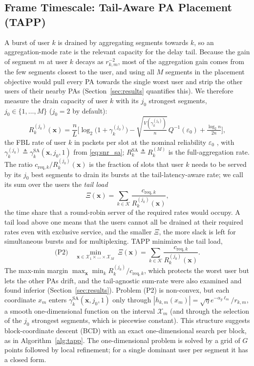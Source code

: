 \documentclass[journal]{IEEEtran}
\newcommand{\creqk}[1]{c_{\mathrm{req},#1}}
\newcommand{\vect}[1]{\bm{#1}}
\newcommand{\Kset}{\mathcal{K}}
\begin{document}
\subsection{Frame Timescale: Tail-Aware PA Placement (TAPP)}\label{sec:tapp}
A burst of user $k$ is drained by aggregating segments towards $k$, so an aggregation-mode rate is the relevant capacity for the delay tail. Because the gain of segment $m$ at user $k$ decays as $r_{k,m}^{-2}$, most of the aggregation gain comes from the few segments closest to the user, and using all $M$ segments in the placement objective would pull every PA towards the single worst user and strip the other users of their nearby PAs (Section~\ref{sec:results} quantifies this). We therefore measure the drain capacity of user $k$ with its $j_0$ strongest segments, $j_0\in\{1,\dots,M\}$ ($j_0=2$ by default):
\begin{equation}\label{eq:Rsa}
R_k^{(j_0)}(\vect x)=\frac{n}{L}\Big[\log_2\!\big(1+\gamma_k^{(j_0)}\big)-\sqrt{\tfrac{V(\gamma_k^{(j_0)})}{n}}\,Q^{-1}(\varepsilon_0)+\tfrac{\log_2 n}{2n}\Big],
\end{equation}
the FBL rate of user $k$ in packets per slot at the nominal reliability $\varepsilon_0$ \cite{Polyanskiy2010}, with $\gamma_k^{(j_0)}\triangleq\gamma_k^{\mathrm{SA}}(\vect x,j_0,1)$ from \eqref{eq:snr_sa}; $R_k^{\mathrm{SA}}\triangleq R_k^{(M)}$ is the full-aggregation rate. The ratio $\creqk{k}/R_k^{(j_0)}(\vect x)$ is the fraction of slots that user $k$ needs to be served by its $j_0$ best segments to drain its bursts at the tail-latency-aware rate; we call its sum over the users the \emph{tail load}
\begin{equation}\label{eq:load}
\Xi(\vect x)=\sum_{k\in\Kset}\frac{\creqk{k}}{R_k^{(j_0)}(\vect x)},
\end{equation}
the time share that a round-robin server of the required rates would occupy. A tail load above one means that the users cannot all be drained at their required rates even with exclusive service, and the smaller $\Xi$, the more slack is left for simultaneous bursts and for multiplexing. TAPP minimizes the tail load,
\begin{equation}\label{eq:P2}
\text{(P2)}\quad\min_{\vect x\in\mathcal X_1\times\dots\times\mathcal X_M}\ \Xi(\vect x)=\sum_{k\in\Kset}\frac{\creqk{k}}{R_k^{(j_0)}(\vect x)}.
\end{equation}
The max-min margin $\max_{\vect x}\min_k R_k^{(j_0)}/\creqk{k}$, which protects the worst user but lets the other PAs drift, and the tail-agnostic sum-rate were also examined and found inferior (Section~\ref{sec:results}).
Problem (P2) is non-convex, but each coordinate $x_m$ enters $\gamma_k^{\mathrm{SA}}(\vect x,j_0,1)$ only through $|h_{k,m}(x_m)|=\sqrt\eta e^{-\alpha_g\ell_m}/r_{k,m}$, a smooth one-dimensional function on the interval $\mathcal X_m$ (and through the selection of the $j_0$ strongest segments, which is piecewise constant). This structure suggests block-coordinate descent (BCD) with an exact one-dimensional search per block, as in Algorithm~\ref{alg:tapp}. The one-dimensional problem is solved by a grid of $G$ points followed by local refinement; for a single dominant user per segment it has a closed form.
\end{document}
